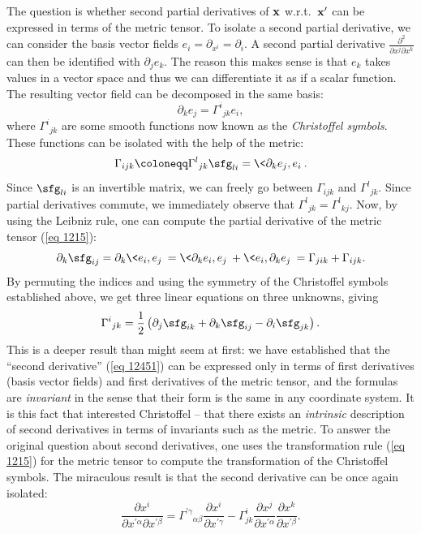 \begin{rem}
    The question is whether second partial derivatives of $\bf{x}$ w.r.t.\ $\bf{x}'$ can be expressed in terms of the metric tensor. To isolate a second partial derivative, we can consider the basis vector fields $e_i=\partial_{x^i}=\partial_i$. A second partial derivative $\frac{\partial^2}{\partial x^j\partial x^k}$ can then be identified with $\partial_{j}e_k$. The reason this makes sense is that $e_k$ takes values in a vector space and thus we can differentiate it as if a scalar function.  The resulting vector field can be decomposed in the same basis:
    \[\partial_{k}e_j=\Gamma^i{}_{jk}e_i,\label{eq 12451}\]
    where $\Gamma^i{}_{jk}$ are some smooth functions now known as the \emph{Christoffel symbols}. These functions can be isolated with the help of the metric:
    \[\Gamma_{ijk}\coloneqq\Gamma^l{}_{jk}\sfg_{li}=\<\partial_{k}e_j,e_i\>.\label{eq 1242308}\]
    Since $\sfg_{li}$ is an invertible matrix, we can freely go between $\Gamma_{ijk}$ and $\Gamma^l{}_{jk}$. Since partial derivatives commute, we immediately observe that $\Gamma^l{}_{jk}=\Gamma^l{}_{kj}$. Now, by using the Leibniz rule, one can compute the partial derivative of the metric tensor (\ref{eq 1215}):
    \[\partial_k \sfg_{ij}=\partial_k \<e_i,e_j\>= \<\partial_k e_i,e_j\>+ \<e_i,\partial_k e_j\>=\Gamma_{jik}+\Gamma_{ijk}.\label{eq 180512}\]
    By permuting the indices and using the symmetry of the Christoffel symbols established above, we get three linear equations on three unknowns, giving
    \[\Gamma^i{}_{jk}=\frac{1}{2}\left(\partial_j \sfg_{ik}+\partial_k\sfg_{ij}-\partial_{i}\sfg_{jk}\right).\]
    This is a deeper result than might seem at first: we have established that the ``second derivative'' (\ref{eq 12451}) can be expressed only in terms of first derivatives (basis vector fields) and first derivatives of the metric tensor, and the formulas are \emph{invariant} in the sense that their form is the same in any coordinate system. It is this fact that interested Christoffel -- that there exists an \emph{intrinsic} description of second derivatives in terms of invariants such as the metric. To answer the original question about second derivatives, one uses the transformation rule (\ref{eq 1215}) for the metric tensor to compute the transformation of the Christoffel symbols. The miraculous result is that the second derivative can be once again isolated:
    \[\frac{\partial x^i}{\partial x^{\prime\alpha}\partial x^{\prime\beta}}=\Gamma^{\prime \gamma}{}_{\alpha\beta}\frac{\partial x^i}{\partial x^{\prime \gamma}}-\Gamma^i_{jk}\frac{\partial x^j}{\partial x^{\prime\alpha}}\frac{\partial x^k}{\partial x^{\prime\beta}}.\label{eq christoffel second derivative}\]

\end{rem}
